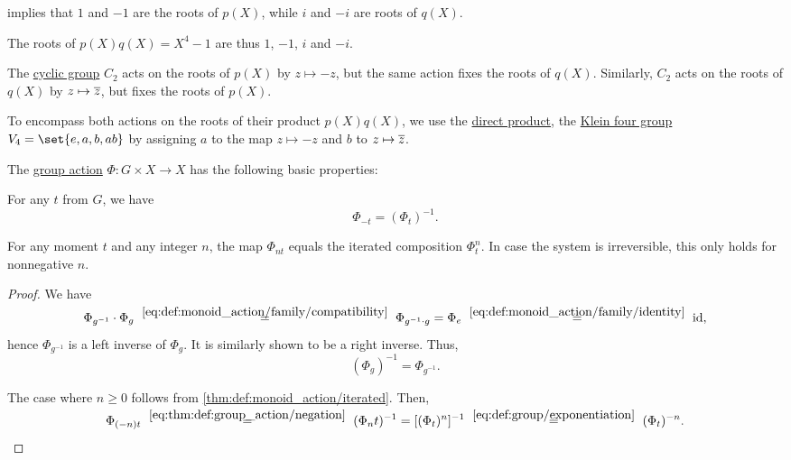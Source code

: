 \begin{example}
\begin{thmenum}
     implies that \( 1 \) and \( -1 \) are the roots of \( p(X) \), while \( i \) and \( -i \) are roots of \( q(X) \).

    The roots of \( p(X) q(X) = X^4 - 1 \) are thus \( 1 \), \( -1 \), \( i \) and \( -i \).

    The \hyperref[def:cyclic_group]{cyclic group} \( C_2 \) acts on the roots of \( p(X) \) by \( z \mapsto -z \), but the same action fixes the roots of \( q(X) \). Similarly, \( C_2 \) acts on the roots of \( q(X) \) by \( z \mapsto \oline z \), but fixes the roots of \( p(X) \).

    To encompass both actions on the roots of their product \( p(X) q(X) \), we use the \hyperref[def:first_order_direct_product]{direct product}, the \hyperref[def:klein_four_group]{Klein four group} \( V_4 = \set{ e, a, b, ab } \) by assigning \( a \) to the map \( z \mapsto -z \) and \( b \) to \( z \mapsto \oline z \).
  \end{thmenum}
\end{example}

\begin{proposition}\label{thm:def:group_action}
  The \hyperref[def:group_action]{group action} \( \Phi: G \times X \to X \) has the following basic properties:
  \begin{thmenum}
     For any \( t \) from \( G \), we have
    \begin{equation}\label{eq:thm:def:group_action/negation}
      \Phi_{-t} = (\Phi_t)^{-1}.
    \end{equation}

     For any moment \( t \) and any integer \( n \), the map \( \Phi_{nt} \) equals the iterated composition \( \Phi_t^n \). In case the system is irreversible, this only holds for nonnegative \( n \).
  \end{thmenum}
\end{proposition}
\begin{proof}
   We have
  \begin{equation*}
    \Phi_{g^{-1}} \cdot \Phi_g
    \reloset {\eqref{eq:def:monoid_action/family/compatibility}} =
    \Phi_{g^{-1} \cdot g}
    =
    \Phi_e
    \reloset {\eqref{eq:def:monoid_action/family/identity}} =
    \id,
  \end{equation*}
  hence \( \Phi_{g^{-1}} \) is a left inverse of \( \Phi_g \). It is similarly shown to be a right inverse. Thus,
  \begin{equation*}
    (\Phi_g)^{-1} = \Phi_{g^{-1}}.
  \end{equation*}

   The case where \( n \geq 0 \) follows from \cref{thm:def:monoid_action/iterated}. Then,
  \begin{equation*}
    \Phi_{(-n)t}
    \reloset {\eqref{eq:thm:def:group_action/negation}} =
    (\Phi_nt)^{-1}
    =
    [(\Phi_t)^n]^{-1}
    \reloset {\eqref{eq:def:group/exponentiation}} =
    (\Phi_t)^{-n}.
  \end{equation*}
\end{proof}

